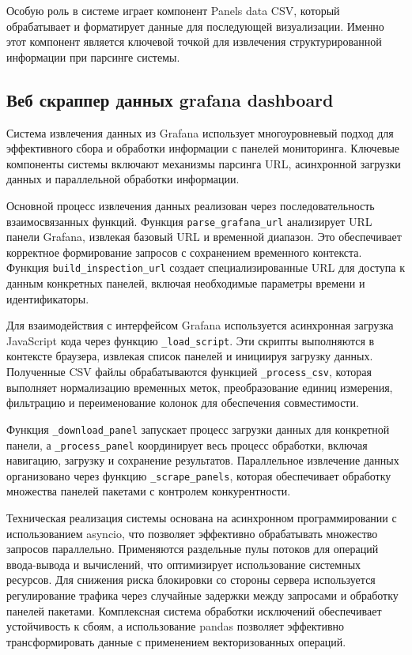Особую роль в системе играет компонент Panels data CSV, который обрабатывает и
форматирует данные для последующей визуализации. Именно этот компонент является
ключевой точкой для извлечения структурированной информации при парсинге
системы.

\subsection{Веб скраппер данных grafana dashboard}

Система извлечения данных из Grafana использует многоуровневый подход для
эффективного сбора и обработки информации с панелей мониторинга. Ключевые
компоненты системы включают механизмы парсинга URL, асинхронной загрузки данных
и параллельной обработки информации.

Основной процесс извлечения данных реализован через последовательность
взаимосвязанных функций. Функция \texttt{parse\_grafana\_url} анализирует URL
панели Grafana, извлекая базовый URL и временной диапазон. Это обеспечивает
корректное формирование запросов с сохранением временного контекста. Функция
\texttt{build\_inspection\_url} создает специализированные URL для доступа к
данным конкретных панелей, включая необходимые параметры времени и
идентификаторы.

Для взаимодействия с интерфейсом Grafana используется асинхронная загрузка
JavaScript кода через функцию \texttt{\_load\_script}. Эти скрипты выполняются в
контексте браузера, извлекая список панелей и инициируя загрузку данных.
Полученные CSV файлы обрабатываются функцией \texttt{\_process\_csv}, которая
выполняет нормализацию временных меток, преобразование единиц измерения,
фильтрацию и переименование колонок для обеспечения совместимости.

Функция \texttt{\_download\_panel} запускает процесс загрузки данных для
конкретной панели, а \texttt{\_process\_panel} координирует весь процесс
обработки, включая навигацию, загрузку и сохранение результатов. Параллельное
извлечение данных организовано через функцию \texttt{\_scrape\_panels}, которая
обеспечивает обработку множества панелей пакетами с контролем конкурентности.

Техническая реализация системы основана на асинхронном программировании с
использованием asyncio, что позволяет эффективно обрабатывать множество
запросов параллельно. Применяются раздельные пулы потоков для операций
ввода-вывода и вычислений, что оптимизирует использование системных ресурсов.
Для снижения риска блокировки со стороны сервера используется регулирование
трафика через случайные задержки между запросами и обработку панелей пакетами.
Комплексная система обработки исключений обеспечивает устойчивость к сбоям, а
использование pandas позволяет эффективно трансформировать данные с применением
векторизованных операций.

